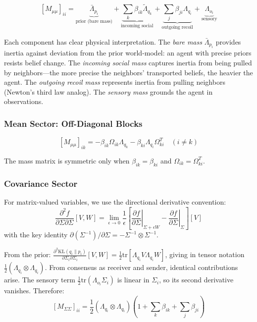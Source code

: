 \documentclass[11pt]{article}
\begin{document}
\begin{equation}
\boxed{[M_{\mu\mu}]_{ii} = \underbrace{\bar{\Lambda}_{p_i}}_{\text{prior (bare mass)}} + \underbrace{\sum_k \beta_{ik}\tilde{\Lambda}_{q_k}}_{\text{incoming social}} + \underbrace{\sum_j \beta_{ji}\Lambda_{q_i}}_{\text{outgoing recoil}} + \underbrace{\Lambda_{o_i}}_{\text{sensory}}}
\label{eq:mass_diagonal}
\end{equation}

Each component has clear physical interpretation. The \emph{bare mass} $\bar{\Lambda}_{p_i}$ provides inertia against deviation from the prior world-model: an agent with precise priors resists belief change. The \emph{incoming social mass} captures inertia from being pulled by neighbors---the more precise the neighbors' transported beliefs, the heavier the agent. The \emph{outgoing recoil mass} represents inertia from pulling neighbors (Newton's third law analog). The \emph{sensory mass} grounds the agent in observations.

\subsubsection{Mean Sector: Off-Diagonal Blocks}

\begin{equation}
\boxed{[M_{\mu\mu}]_{ik} = -\beta_{ik}\Omega_{ik}\Lambda_{q_k} - \beta_{ki}\Lambda_{q_i}\Omega_{ki}^T \quad (i \neq k)}
\label{eq:mass_offdiag}
\end{equation}

The mass matrix is symmetric only when $\beta_{ik} = \beta_{ki}$ and $\Omega_{ik} = \Omega_{ki}^T$.

\subsubsection{Covariance Sector}

For matrix-valued variables, we use the directional derivative convention:
\begin{equation}
\frac{\partial^2 f}{\partial \Sigma \partial \Sigma}[V, W] = \lim_{\epsilon \to 0} \frac{1}{\epsilon}\left[\left.\frac{\partial f}{\partial \Sigma}\right|_{\Sigma + \epsilon W} - \left.\frac{\partial f}{\partial \Sigma}\right|_{\Sigma}\right][V]
\end{equation}
with the key identity $\partial(\Sigma^{-1})/\partial \Sigma = -\Sigma^{-1} \otimes \Sigma^{-1}$.

From the prior: $\frac{\partial^2 \mathrm{KL}(q_i \| p_i)}{\partial \Sigma_i \partial \Sigma_i}[V, W] = \frac{1}{2}\mathrm{tr}[\Lambda_{q_i} V \Lambda_{q_i} W]$, giving in tensor notation $\frac{1}{2}(\Lambda_{q_i} \otimes \Lambda_{q_i})$. From consensus as receiver and sender, identical contributions arise. The sensory term $\frac{1}{2}\mathrm{tr}(\Lambda_{o_i}\Sigma_i)$ is linear in $\Sigma_i$, so its second derivative vanishes. Therefore:
\begin{equation}
\boxed{[M_{\Sigma\Sigma}]_{ii} = \frac{1}{2}(\Lambda_{q_i} \otimes \Lambda_{q_i})\left(1 + \sum_k\beta_{ik} + \sum_j\beta_{ji}\right)}
\label{eq:mass_cov}
\end{equation}
\end{document}
